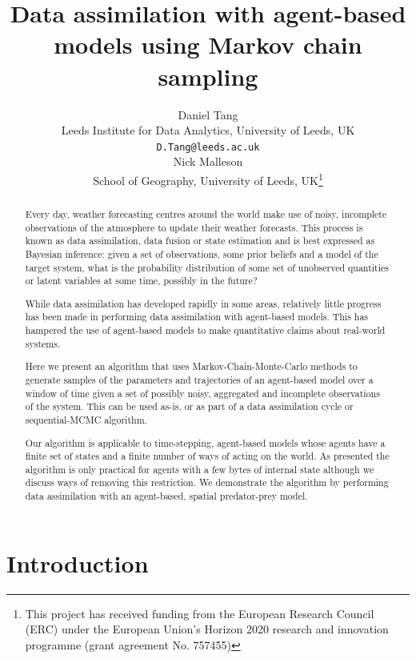 \documentclass{article}
\title{Data assimilation with agent-based models using Markov chain sampling}
\author{
  Daniel Tang\\
    Leeds Institute for Data Analytics, University of Leeds, UK\\
  \texttt{D.Tang@leeds.ac.uk}\\
  \AND
  Nick Malleson\\
  School of Geography, University of Leeds, UK\thanks{This project has received funding from the European Research Council (ERC) under the European Union’s Horizon 2020 research and innovation programme (grant agreement No. 757455)}
  \\  
}
\begin{document}
\maketitle

\begin{abstract}
Every day, weather forecasting centres around the world make use of noisy, incomplete observations of the atmosphere to update their weather forecasts. This process is known as data assimilation, data fusion or state estimation and is best expressed as Bayesian inference: given a set of observations, some prior beliefs and a model of the target system, what is the probability distribution of some set of unobserved quantities or latent variables at some time, possibly in the future?

While data assimilation has developed rapidly in some areas, relatively little progress has been made in performing data assimilation with agent-based models. This has hampered the use of agent-based models to make quantitative claims about real-world systems.

Here we present an algorithm that uses Markov-Chain-Monte-Carlo methods to generate samples of the parameters and trajectories of an agent-based model over a window of time given a set of possibly noisy, aggregated and incomplete observations of the system. This can be used as-is, or as part of a data assimilation cycle or sequential-MCMC algorithm.

Our algorithm is applicable to time-stepping, agent-based models whose agents have a finite set of states and a finite number of ways of acting on the world. As presented the algorithm is only practical for agents with a few bytes of internal state although we discuss ways of removing this restriction. We demonstrate the algorithm by performing data assimilation with an agent-based, spatial predator-prey model.
\end{abstract}


\section{Introduction}
\end{document}

